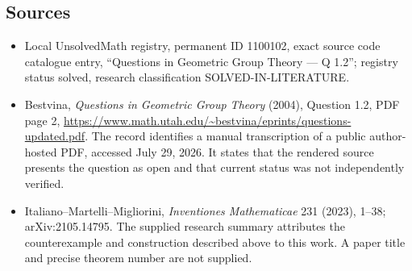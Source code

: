 \documentclass[11pt]{article}
\begin{document}
\subsection{Sources}
\begin{itemize}
\item Local UnsolvedMath registry, permanent ID 1100102, exact source code catalogue entry, ``Questions in Geometric Group Theory --- Q 1.2''; registry status solved, research classification SOLVED-IN-LITERATURE.
\item Bestvina, \emph{Questions in Geometric Group Theory} (2004), Question 1.2, PDF page 2, \url{https://www.math.utah.edu/~bestvina/eprints/questions-updated.pdf}. The record identifies a manual transcription of a public author-hosted PDF, accessed July 29, 2026. It states that the rendered source presents the question as open and that current status was not independently verified.
\item Italiano--Martelli--Migliorini, \emph{Inventiones Mathematicae} 231 (2023), 1--38; arXiv:2105.14795. The supplied research summary attributes the counterexample and construction described above to this work. A paper title and precise theorem number are not supplied.
\end{itemize}
\end{document}
